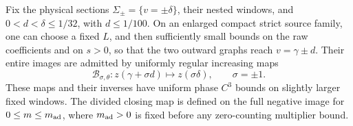 \begin{lemma}
\label{ann:p0-fixed-tail-ports}
Fix the physical sections \(\Sigma_\pm=\{v=\pm\delta\}\), their
nested windows, and \(0<d<\delta\le1/32\), with \(d\le1/100\).
On an enlarged compact strict source family, one can choose a fixed
\(L\), and then sufficiently small bounds on the raw coefficients
and on \(s>0\), so that the two outward graphs reach
\(v=\gamma\pm d\). Their entire images are admitted by uniformly
regular increasing maps
\[
 \mathcal B_{\sigma,\theta}:z(\gamma+\sigma d)
       \longmapsto z(\sigma\delta),\qquad \sigma=\pm1.
\]
These maps and their inverses have uniform phase \(C^3\) bounds on
slightly larger fixed windows. The divided closing map is defined on
the full negative image for \(0\le m\le m_{\rm ad}\), where
\(m_{\rm ad}>0\) is fixed before any zero-counting multiplier bound.
\end{lemma}

